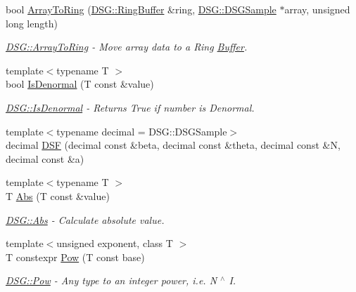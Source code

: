 \begin{DoxyCompactItemize}
bool \hyperlink{namespace_d_s_g_a608643638b3a678c17b14c406d7edc85}{Array\+To\+Ring} (\hyperlink{class_d_s_g_1_1_ring_buffer}{D\+S\+G\+::\+Ring\+Buffer} \&ring, \hyperlink{namespace_d_s_g_ac39a94cd27ebcd9c1e7502d0c624894a}{D\+S\+G\+::\+D\+S\+G\+Sample} $\ast$array, unsigned long length)
\begin{DoxyCompactList}\small\item\em \hyperlink{namespace_d_s_g_a608643638b3a678c17b14c406d7edc85}{D\+S\+G\+::\+Array\+To\+Ring} -\/ Move array data to a Ring \hyperlink{class_d_s_g_1_1_buffer}{Buffer}. \end{DoxyCompactList}\item 
{\footnotesize template$<$typename T $>$ }\\bool \hyperlink{namespace_d_s_g_a9eee3c39a1f45d42f0b4fa7201d3ba3d}{Is\+Denormal} (T const \&value)
\begin{DoxyCompactList}\small\item\em \hyperlink{namespace_d_s_g_a9eee3c39a1f45d42f0b4fa7201d3ba3d}{D\+S\+G\+::\+Is\+Denormal} -\/ Returns True if number is Denormal. \end{DoxyCompactList}\item 
{\footnotesize template$<$typename decimal  = D\+S\+G\+::\+D\+S\+G\+Sample$>$ }\\decimal \hyperlink{namespace_d_s_g_aac6959add6359f512191ddcd17fd6373}{D\+S\+F} (decimal const \&beta, decimal const \&theta, decimal const \&N, decimal const \&a)
\item 
{\footnotesize template$<$typename T $>$ }\\T \hyperlink{namespace_d_s_g_a0af03bade7e25e8da80e3022af0e45a7}{Abs} (T const \&value)
\begin{DoxyCompactList}\small\item\em \hyperlink{namespace_d_s_g_a0af03bade7e25e8da80e3022af0e45a7}{D\+S\+G\+::\+Abs} -\/ Calculate absolute value. \end{DoxyCompactList}\item 
{\footnotesize template$<$unsigned exponent, class T $>$ }\\T constexpr \hyperlink{namespace_d_s_g_a34372a42acb2d6d62d18effc379857bc}{Pow} (T const base)
\begin{DoxyCompactList}\small\item\em \hyperlink{namespace_d_s_g_a34372a42acb2d6d62d18effc379857bc}{D\+S\+G\+::\+Pow} -\/ Any type to an integer power, i.\+e. N $^\wedge$ I. \end{DoxyCompactList}\item 

\end{DoxyCompactItemize}
